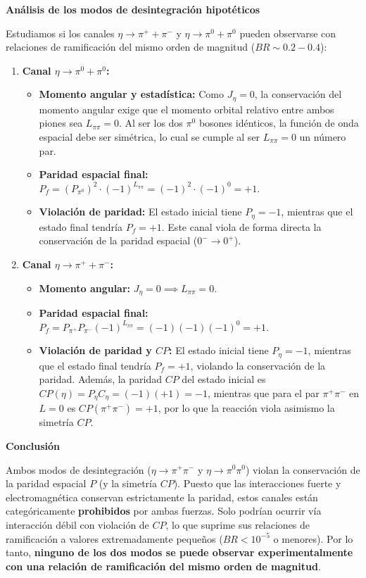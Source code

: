 \begin{problema}
\vspace{0.3cm}
\textbf{Análisis de los modos de desintegración hipotéticos}

Estudiamos si los canales $\eta \to \pi^+ + \pi^-$ y $\eta \to \pi^0 + \pi^0$ pueden observarse con relaciones de ramificación del mismo orden de magnitud ($BR \sim 0.2 - 0.4$):

\begin{enumerate}[label=\arabic*.]
    \item \textbf{Canal $\eta \to \pi^0 + \pi^0$:}
    \begin{itemize}
        \item \textbf{Momento angular y estadística:} Como $J_\eta = 0$, la conservación del momento angular exige que el momento orbital relativo entre ambos piones sea $L_{\pi\pi} = 0$. Al ser los dos $\pi^0$ bosones idénticos, la función de onda espacial debe ser simétrica, lo cual se cumple al ser $L_{\pi\pi} = 0$ un número par.
        \item \textbf{Paridad espacial final:} $P_f = (P_{\pi^0})^2 \cdot (-1)^{L_{\pi\pi}} = (-1)^2 \cdot (-1)^0 = +1$.
        \item \textbf{Violación de paridad:} El estado inicial tiene $P_\eta = -1$, mientras que el estado final tendría $P_f = +1$. Este canal viola de forma directa la conservación de la paridad espacial ($0^- \to 0^+$).
    \end{itemize}

    \item \textbf{Canal $\eta \to \pi^+ + \pi^-$:}
    \begin{itemize}
        \item \textbf{Momento angular:} $J_\eta = 0 \implies L_{\pi\pi} = 0$.
        \item \textbf{Paridad espacial final:} $P_f = P_{\pi^+} P_{\pi^-} (-1)^{L_{\pi\pi}} = (-1)(-1)(-1)^0 = +1$.
        \item \textbf{Violación de paridad y $CP$:} El estado inicial tiene $P_\eta = -1$, mientras que el estado final tendría $P_f = +1$, violando la conservación de la paridad. Además, la paridad $CP$ del estado inicial es $CP(\eta) = P_\eta C_\eta = (-1)(+1) = -1$, mientras que para el par $\pi^+\pi^-$ en $L=0$ es $CP(\pi^+\pi^-) = +1$, por lo que la reacción viola asimismo la simetría $CP$.
    \end{itemize}
\end{enumerate}

\textbf{Conclusión}

Ambos modos de desintegración ($\eta \to \pi^+ \pi^-$ y $\eta \to \pi^0 \pi^0$) violan la conservación de la paridad espacial $P$ (y la simetría $CP$). Puesto que las interacciones fuerte y electromagnética conservan estrictamente la paridad, estos canales están categóricamente \textbf{prohibidos} por ambas fuerzas. Solo podrían ocurrir vía interacción débil con violación de $CP$, lo que suprime sus relaciones de ramificación a valores extremadamente pequeños ($BR < 10^{-5}$ o menores). Por lo tanto, \textbf{ninguno de los dos modos se puede observar experimentalmente con una relación de ramificación del mismo orden de magnitud}.
\end{problema}

